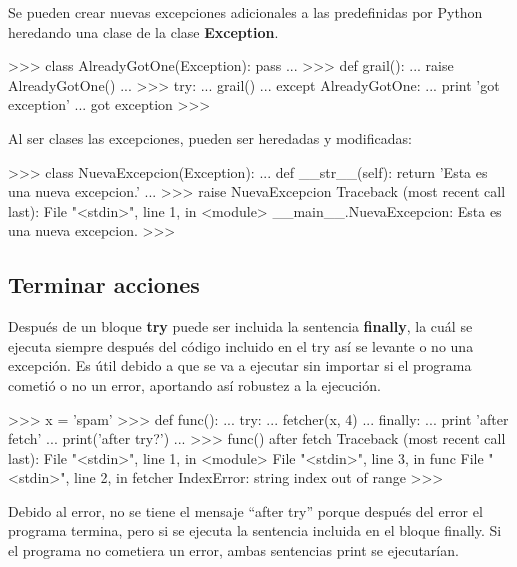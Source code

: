 Se pueden crear nuevas excepciones adicionales a las predefinidas por Python heredando una clase de la clase \textbf{Exception}. \\

\begin{pyglist} [language=python]
>>> class AlreadyGotOne(Exception): pass 
... 
>>> def grail(): 
...     raise AlreadyGotOne() 
... 
>>> try:
...     grail()
... except AlreadyGotOne:
...     print 'got exception'
... 
got exception
>>> 
\end{pyglist}

Al ser clases las excepciones, pueden ser heredadas y modificadas:\\

\begin{pyglist} [language=python]
>>> class NuevaExcepcion(Exception):
...     def __str__(self): return 'Esta es una nueva excepcion.'
... 
>>> raise NuevaExcepcion
Traceback (most recent call last):
  File "<stdin>", line 1, in <module>
__main__.NuevaExcepcion: Esta es una nueva excepcion.
>>> 
\end{pyglist}

\subsection{Terminar acciones}

Después de un bloque \textbf{try} puede ser incluida la sentencia \textbf{finally}, la cuál se ejecuta siempre después del código incluido en el try así se levante o no una excepción. Es útil debido a que se va a ejecutar sin importar si el programa cometió o no un error, aportando así robustez a la ejecución.\\

\begin{pyglist} [language=python]
>>> x = 'spam'
>>> def func():
...     try:
...         fetcher(x, 4)
...     finally:
...         print 'after fetch'
...     print('after try?')
... 
>>> func()
after fetch
Traceback (most recent call last):
  File "<stdin>", line 1, in <module>
  File "<stdin>", line 3, in func
  File "<stdin>", line 2, in fetcher
IndexError: string index out of range
>>> 
\end{pyglist}

Debido al error, no se tiene el mensaje ``after try'' porque después del error el programa termina, pero si se ejecuta la sentencia incluida en el bloque finally. Si el programa no cometiera un error, ambas sentencias print se ejecutarían.\\

